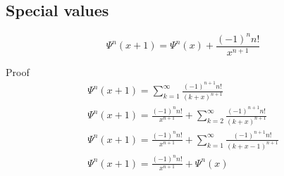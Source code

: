\documentclass[a4paper]{article}
\begin{document}
    \subsection{Special values}\label{gf:subsec:special-values}
    \begin{theorem}
        \begin{equation}
            \Psi^{n}(x+1) = \Psi^{n}(x) + \frac{(-1)^n n!}{x^{n+1}} \label{gf:eq:equation12}
        \end{equation}

        Proof
        \\
        \begin{gather*}
            \Psi^{n}(x + 1) = \sum_{k=1}^{\infty} \frac{(-1)^{n+1} n! }{(k+x)^{n+1}}
            \\
            \Psi^{n}(x + 1) = \frac{(-1)^n n!}{x^{n+1}}  + \sum_{k=2}^{\infty} \frac{(-1)^{n+1} n! }{(k+x)^{n+1}}
            \\
            \Psi^{n}(x + 1) = \frac{(-1)^n n!}{x^{n+1}}  + \sum_{k=1}^{\infty} \frac{(-1)^{n+1} n! }{(k+x - 1)^{n+1}}
            \\
            \Psi^{n}(x + 1) = \frac{(-1)^n n!}{x^{n+1}}  + \Psi^{n}(x)
        \end{gather*}
    \end{theorem}
\end{document}
